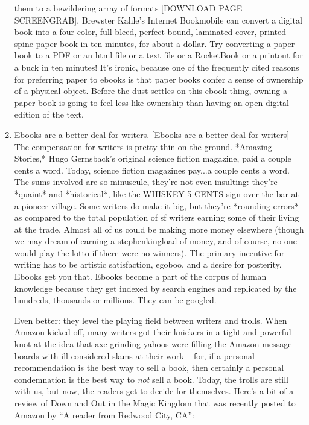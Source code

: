 \begin{enumerate}
  them to a bewildering array of formats [DOWNLOAD PAGE SCREENGRAB].
  Brewster Kahle's Internet Bookmobile can convert a digital book
  into a four-color, full-bleed, perfect-bound, laminated-cover,
  printed-spine paper book in ten minutes, for about a dollar. Try
  converting a paper book to a PDF or an html file or a text file or
  a RocketBook or a printout for a buck in ten minutes! It's ironic,
  because one of the frequently cited reasons for preferring paper to
  ebooks is that paper books confer a sense of ownership of a
  physical object. Before the dust settles on this ebook thing,
  owning a paper book is going to feel less like ownership than
  having an open digital edition of the text.
\item
  Ebooks are a better deal for writers. [Ebooks are a better deal for
  writers] The compensation for writers is pretty thin on the ground.
  *Amazing Stories,* Hugo Gernsback's original science fiction
  magazine, paid a couple cents a word. Today, science fiction
  magazines pay...a couple cents a word. The sums involved are so
  minuscule, they're not even insulting: they're *quaint* and
  *historical*, like the WHISKEY 5 CENTS sign over the bar at a
  pioneer village. Some writers do make it big, but they're *rounding
  errors* as compared to the total population of sf writers earning
  some of their living at the trade. Almost all of us could be making
  more money elsewhere (though we may dream of earning a
  stephenkingload of money, and of course, no one would play the
  lotto if there were no winners). The primary incentive for writing
  has to be artistic satisfaction, egoboo, and a desire for
  posterity. Ebooks get you that. Ebooks become a part of the corpus
  of human knowledge because they get indexed by search engines and
  replicated by the hundreds, thousands or millions. They can be
  googled.
  
  Even better: they level the playing field between writers and
  trolls. When Amazon kicked off, many writers got their knickers in
  a tight and powerful knot at the idea that axe-grinding yahoos were
  filling the Amazon message-boards with ill-considered slams at
  their work -- for, if a personal recommendation is the best way to
  sell a book, then certainly a personal condemnation is the best way
  to \emph{not} sell a book. Today, the trolls are still with us,
  but now, the readers get to decide for themselves. Here's a bit of
  a review of Down and Out in the Magic Kingdom that was recently
  posted to Amazon by ``A reader from Redwood City, CA'':
  

\end{enumerate}
